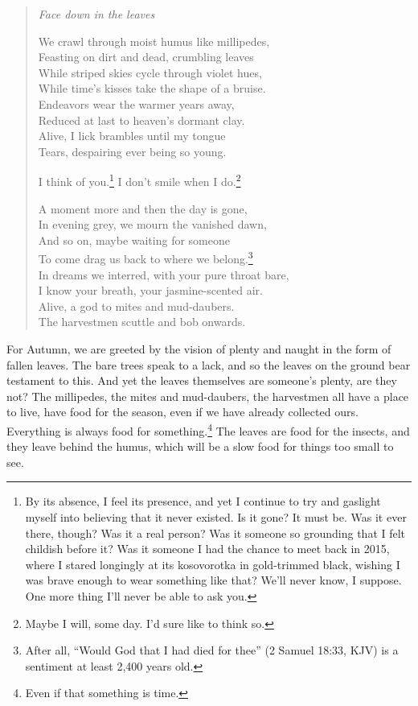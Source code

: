 \documentclass[12pt,oneside]{memoir}
\begin{document}
\begin{verse}
\emph{Face down in the leaves}

We crawl through moist humus like millipedes, \\
Feasting on dirt and dead, crumbling leaves \\
While striped skies cycle through violet hues, \\
While time's kisses take the shape of a bruise. \\
Endeavors wear the warmer years away, \\
Reduced at last to heaven's dormant clay. \\
Alive, I lick brambles until my tongue \\
Tears, despairing ever being so young.

I think of you.\footnote{By its absence, I feel its presence, and yet I continue to try and gaslight myself into believing that it never existed. Is it gone? It must be. Was it ever there, though? Was it a real person? Was it someone so grounding that I felt childish before it? Was it someone I had the chance to meet back in 2015, where I stared longingly at its kosovorotka in gold-trimmed black, wishing I was brave enough to wear something like that? We'll never know, I suppose. One more thing I'll never be able to ask you.} I don't smile when I do.\footnote{Maybe I will, some day. I'd sure like to think so.}

A moment more and then the day is gone, \\
In evening grey, we mourn the vanished dawn, \\
And so on, maybe waiting for someone \\
To come drag us back to where we belong.\footnote{After all, ``Would God that I had died for thee'' (2 Samuel 18:33, KJV) is a sentiment at least 2,400 years old.} \\
In dreams we interred, with your pure throat bare, \\
I know your breath, your jasmine-scented air. \\
Alive, a god to mites and mud-daubers. \\
The harvestmen scuttle and bob onwards.

\parencite[9]{leaves}
\end{verse}

For Autumn, we are greeted by the vision of plenty and naught in the form of fallen leaves. The bare trees speak to a lack, and so the leaves on the ground bear testament to this. And yet the leaves themselves are someone's plenty, are they not? The millipedes, the mites and mud-daubers, the harvestmen all have a place to live, have food for the season, even if we have already collected ours. Everything is always food for something.\footnote{Even if that something is time.} The leaves are food for the insects, and they leave behind the humus, which will be a slow food for things too small to see.
\end{document}
